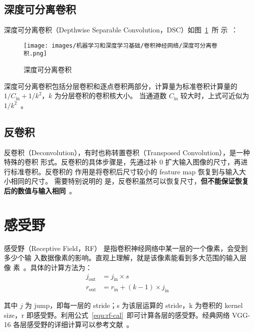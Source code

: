 \subsection{深度可分离卷积}\label{subsec:DSC}

深度可分离卷积（Depthwise Separable Convolution，DSC）如图~\ref{fig:ds-conv}~所
示~：

\begin{figure}[ht]
  \centering
  \texttt{[image: images/机器学习和深度学习基础/卷积神经网络/深度可分离卷积.png]}
  \caption{深度可分离卷积}\label{fig:ds-conv}
\end{figure}

深度可分离卷积包括分层卷积和逐点卷积两部分，计算量为标准卷积计算量的 $ 1 /
C_{\mathrm{in}} + 1/k^2 $，$k$ 为分层卷积的卷积核大小。
当通道数 $C_{\mathrm{in}}$ 较大时，上式可近似为 $1 /
k^2$~。

\subsection{反卷积}\label{subsec:deconv}
反卷积（Deconvolution），有时也称转置卷积（Transposed Convolution），是一种特殊的卷积
形式。反卷积的具体步骤是，先通过补 0 扩大输入图像的尺寸，再进行标准卷积。反卷积的
作用是将卷积后尺寸较小的 feature map 恢复到与输入大小相同的尺寸。 需要特别说明的
是，反卷积虽然可以恢复尺寸，\textbf{但不能保证恢复后的数值与输入相同}~。

\section{感受野}

感受野（Receptive Field，RF） 是指卷积神经网络中某一层的一个像素，会受到多少个输
入数据像素的影响。直观上理解，就是该像素能看到多大范围的输入层像
素~。具体的计算方法为：
\begin{align}
\label{equ:rf-cal}
j_{\mathrm {out}} & = j_{\mathrm{in}} \times s \\
r_{\mathrm {out}} & = r_{\mathrm{in}} + (k-1) \times j_{\mathrm{in}}
\end{align}

其中 $j$ 为 jump，即每一层的 stride；s 为该层运算的 stride，k 为卷积的 kernel
size，r 即感受野。利用公式~\eqref{equ:rf-cal}~即可计算各层的感受野。经典网络 VGG-16
各层感受野的详细计算可以参考文献~。

